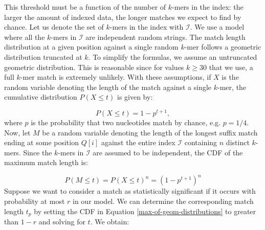 \documentclass[unnumsec,webpdf,contemporary,large]{oup-authoring-template}%
\theoremstyle{thmstyleone}%
\theoremstyle{thmstyletwo}%
\theoremstyle{thmstylethree}%
\begin{document}
This threshold must be a function of the number of $k$-mers in the index: the larger the amount of indexed data, the longer matches we expect to find by chance. Let us denote the set of $k$-mers in the index with $\mathcal I$. We use a model where all the $k$-mers in $\mathcal I$ are independent random strings. The match length distribution at a given position against a single random $k$-mer follows a geometric distribution truncated at $k$. To simplify the formulas, we assume an untruncated geometric distribution. This is reasonable since for values $k \geq 30$ that we use, a full $k$-mer match is extremely unlikely. With these assumptions, if $X$ is the random variable denoting the length of the match against a single $k$-mer, the cumulative distribution $P(X \leq t)$ is given by:

\begin{equation}
    P\left(X \leq t\right) = 1 - p^{t + 1},
\label{geom-distribution}
\end{equation}
where $p$ is the probability that two nucleotides match by chance, e.g. $p = 1/4$. Now, let $M$ be a random variable denoting the length of the longest suffix match ending at some position $Q[i]$ against the entire index $\mathcal{I}$ containing $n$ distinct $k$-mers. Since the $k$-mers in $\mathcal I$ are assumed to be independent, the CDF of the maximum match length is:


\begin{equation}
    P\left(M \leq t\right) = P\left(X \leq t\right)^n = \left(1 - p^{t + 1}\right)^n
\label{max-of-geom-distributions}    
\end{equation}
Suppose we want to consider a match as statistically significant if it occurs with probability at most $r$ in our model. We can determine the corresponding match length $t_p$ by setting the CDF in Equation \ref{max-of-geom-distributions} to greater than $1-r$ and solving for $t$. We obtain:
\end{document}
